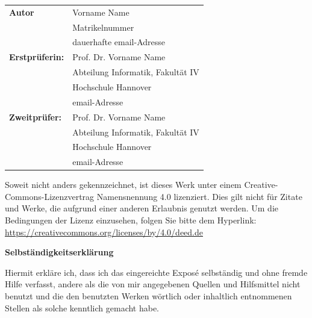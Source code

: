 \documentclass[fontsize=12pt,paper=a4,twoside=semi,parskip=half-,headsepline,headinclude]{scrreprt}
\begin{document}
  \newpage \thispagestyle{empty}
 \begin{tabular}{ll}
{\bfseries\sffamily Autor} &  Vorname Name \\ 
            & Matrikelnummer \\
            & dauerhafte email-Adresse \\[5ex]
{\bfseries\sffamily Erstprüferin:} & Prof. Dr. Vorname Name \\
          & Abteilung Informatik, Fakultät IV \\
         & Hochschule Hannover \\
        & email-Adresse \\[5ex]
{\bfseries\sffamily Zweitprüfer:} &Prof. Dr. Vorname Name \\
          & Abteilung Informatik, Fakultät IV \\
         & Hochschule Hannover \\
        & email-Adresse
\end{tabular}

\vfill

Soweit nicht anders gekennzeichnet, ist dieses Werk unter einem
Creative-Commons-Lizenzvertrag Namensnennung 4.0 lizenziert.
Dies gilt nicht für Zitate und Werke, die aufgrund einer anderen Erlaubnis
genutzt werden.
Um die Bedingungen der Lizenz einzusehen, folgen Sie bitte dem Hyperlink:\\
\url{https://creativecommons.org/licenses/by/4.0/deed.de}

\vfill

\begin{center} \sffamily\bfseries Selbständigkeitserklärung \end{center}

Hiermit erkläre ich, dass ich das eingereichte Exposé
selbständig und ohne fremde Hilfe verfasst, andere als die von mir angegebenen Quellen
und Hilfsmittel nicht benutzt und die den benutzten Werken wörtlich oder
inhaltlich entnommenen Stellen als solche kenntlich gemacht habe. 
\vspace*{7ex}
\end{document}
